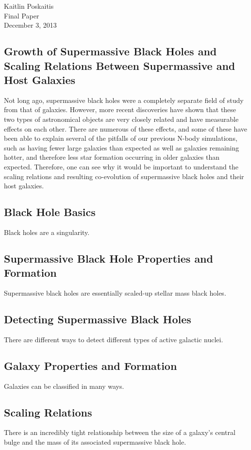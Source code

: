 \documentclass[12pt]{article}
\begin{document}
\noindent Kaitlin Poskaitis\\
Final Paper\\
December 3, 2013
\begin{center}
    \section*{\bf Growth of Supermassive Black Holes and Scaling Relations
              Between Supermassive and Host Galaxies}
\end{center}

Not long ago, supermassive black holes were a completely separate field of study
from that of galaxies.  However, more recent discoveries have shown that these
two types of astronomical objects are very closely related and have measurable
effects on each other.  There are numerous of these effects, and some of these
have been able to explain several of the pitfalls of our previous N-body
simulations, such as having fewer large galaxies than expected as well as
galaxies remaining hotter, and therefore less star formation occurring in older
galaxies than expected.  Therefore, one can see why it would be important to
understand the scaling relations and resulting co-evolution of supermassive
black holes and their host galaxies.

\subsection*{\bf Black Hole Basics}
Black holes are a singularity.

\subsection*{\bf Supermassive Black Hole Properties and Formation}
Supermassive black holes are essentially scaled-up stellar mass black holes.

\subsection*{\bf Detecting Supermassive Black Holes}
There are different ways to detect different types of active galactic nuclei.

\subsection*{\bf Galaxy Properties and Formation}
Galaxies can be classified in many ways.

\subsection*{\bf Scaling Relations}
There is an incredibly tight relationship between the size of a galaxy's central
bulge and the mass of its associated supermassive black hole.
\end{document}
